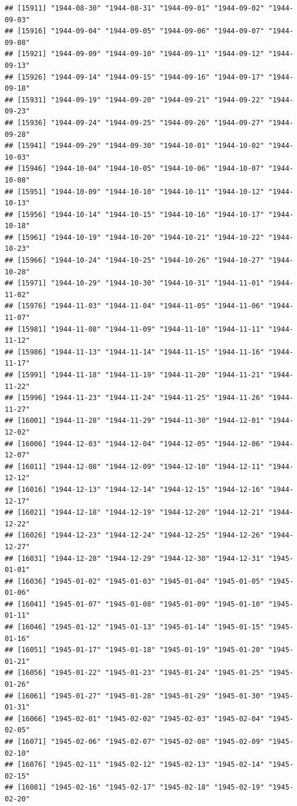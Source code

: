 \documentclass{article}\usepackage[]{graphicx}\usepackage[]{color}
\makeatletter
\newenvironment{kframe}{%
 \def\at@end@of@kframe{}%
 \ifinner\ifhmode%
  \def\at@end@of@kframe{\end{minipage}}%
  \begin{minipage}{\columnwidth}%
 \fi\fi%
 \def\FrameCommand##1{\hskip\@totalleftmargin \hskip-\fboxsep
 \colorbox{shadecolor}{##1}\hskip-\fboxsep
     \hskip-\linewidth \hskip-\@totalleftmargin \hskip\columnwidth}%
 \MakeFramed {\advance\hsize-\width
   \@totalleftmargin\z@ \linewidth\hsize
   \@setminipage}}%
 {\par\unskip\endMakeFramed%
 \at@end@of@kframe}
\newenvironment{knitrout}{}{} %
\makeatother
\begin{document}
\begin{description}
\begin{knitrout}
\begin{kframe}
\begin{verbatim}
## [15911] "1944-08-30" "1944-08-31" "1944-09-01" "1944-09-02" "1944-09-03"
## [15916] "1944-09-04" "1944-09-05" "1944-09-06" "1944-09-07" "1944-09-08"
## [15921] "1944-09-09" "1944-09-10" "1944-09-11" "1944-09-12" "1944-09-13"
## [15926] "1944-09-14" "1944-09-15" "1944-09-16" "1944-09-17" "1944-09-18"
## [15931] "1944-09-19" "1944-09-20" "1944-09-21" "1944-09-22" "1944-09-23"
## [15936] "1944-09-24" "1944-09-25" "1944-09-26" "1944-09-27" "1944-09-28"
## [15941] "1944-09-29" "1944-09-30" "1944-10-01" "1944-10-02" "1944-10-03"
## [15946] "1944-10-04" "1944-10-05" "1944-10-06" "1944-10-07" "1944-10-08"
## [15951] "1944-10-09" "1944-10-10" "1944-10-11" "1944-10-12" "1944-10-13"
## [15956] "1944-10-14" "1944-10-15" "1944-10-16" "1944-10-17" "1944-10-18"
## [15961] "1944-10-19" "1944-10-20" "1944-10-21" "1944-10-22" "1944-10-23"
## [15966] "1944-10-24" "1944-10-25" "1944-10-26" "1944-10-27" "1944-10-28"
## [15971] "1944-10-29" "1944-10-30" "1944-10-31" "1944-11-01" "1944-11-02"
## [15976] "1944-11-03" "1944-11-04" "1944-11-05" "1944-11-06" "1944-11-07"
## [15981] "1944-11-08" "1944-11-09" "1944-11-10" "1944-11-11" "1944-11-12"
## [15986] "1944-11-13" "1944-11-14" "1944-11-15" "1944-11-16" "1944-11-17"
## [15991] "1944-11-18" "1944-11-19" "1944-11-20" "1944-11-21" "1944-11-22"
## [15996] "1944-11-23" "1944-11-24" "1944-11-25" "1944-11-26" "1944-11-27"
## [16001] "1944-11-28" "1944-11-29" "1944-11-30" "1944-12-01" "1944-12-02"
## [16006] "1944-12-03" "1944-12-04" "1944-12-05" "1944-12-06" "1944-12-07"
## [16011] "1944-12-08" "1944-12-09" "1944-12-10" "1944-12-11" "1944-12-12"
## [16016] "1944-12-13" "1944-12-14" "1944-12-15" "1944-12-16" "1944-12-17"
## [16021] "1944-12-18" "1944-12-19" "1944-12-20" "1944-12-21" "1944-12-22"
## [16026] "1944-12-23" "1944-12-24" "1944-12-25" "1944-12-26" "1944-12-27"
## [16031] "1944-12-28" "1944-12-29" "1944-12-30" "1944-12-31" "1945-01-01"
## [16036] "1945-01-02" "1945-01-03" "1945-01-04" "1945-01-05" "1945-01-06"
## [16041] "1945-01-07" "1945-01-08" "1945-01-09" "1945-01-10" "1945-01-11"
## [16046] "1945-01-12" "1945-01-13" "1945-01-14" "1945-01-15" "1945-01-16"
## [16051] "1945-01-17" "1945-01-18" "1945-01-19" "1945-01-20" "1945-01-21"
## [16056] "1945-01-22" "1945-01-23" "1945-01-24" "1945-01-25" "1945-01-26"
## [16061] "1945-01-27" "1945-01-28" "1945-01-29" "1945-01-30" "1945-01-31"
## [16066] "1945-02-01" "1945-02-02" "1945-02-03" "1945-02-04" "1945-02-05"
## [16071] "1945-02-06" "1945-02-07" "1945-02-08" "1945-02-09" "1945-02-10"
## [16076] "1945-02-11" "1945-02-12" "1945-02-13" "1945-02-14" "1945-02-15"
## [16081] "1945-02-16" "1945-02-17" "1945-02-18" "1945-02-19" "1945-02-20"

\end{verbatim}
\end{kframe}
\end{knitrout}
\end{description}
\end{document}
